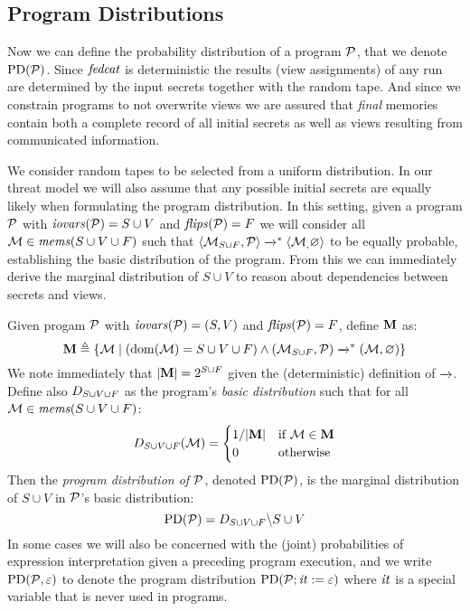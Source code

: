 \subsection{Program Distributions}
Now we can define the probability distribution of a program $\mathcal{P}$,
that we denote $\mathrm{PD}(\mathcal{P})$. Since $\mathit{fedcat}$ is deterministic the
results (view assignments) of any run are determined by the input
secrets together with the random tape. And since we constrain programs
to not overwrite views we are assured that \emph{final} memories
contain both a complete record of all initial secrets as well as views
resulting from communicated information.

We consider random tapes to be selected from a uniform distribution.
In our threat model we will also assume that any possible initial
secrets are equally likely when formulating the program distribution.
In this setting, given a program $\mathcal{P}$ with $\mathit{iovars}(\mathcal{P}) = S \cup
V$ and $\mathit{flips}(\mathcal{P}) = F$ we will consider all $\mathcal{M}
\in \mathit{mems}(S \cup V \cup F)$ such that
$
\langle \mathcal{M}_{S \cup F},\mathcal{P} \rangle \xrightarrow{}^{*} \langle \mathcal{M}_,\varnothing \rangle
$
to be equally probable, establishing the basic distribution of the
program. From this we can immediately derive the marginal distribution
of $S \cup V$ to reason about dependencies between secrets and views. 
\begin{definition}
  \label{def-progd}
  Given progam $\mathcal{P}$ with $\mathit{iovars}(\mathcal{P}) = (S,V)$ and $\mathit{flips}(\mathcal{P}) = F$, define $\mathbf{M}$ as:
  $$
  \mathbf{M} \triangleq \{ \mathcal{M} \mid (\mathrm{dom}(\mathcal{M}) = S \cup V \cup F) \wedge (\mathcal{M}_{S \cup F},\mathcal{P}) \xrightarrow{}^{*} (\mathcal{M},\varnothing) \}
  $$
  We note immediately that $|\mathbf{M}| = 2^{S \cup F}$ given the (deterministic) definition of $\xrightarrow{}$. 
  Define also $D_{S \cup V \cup F}$ as the program's \emph{basic distribution} such that for all
  $\mathcal{M} \in \mathit{mems}(S \cup V \cup F)$:
  $$
  D_{S \cup V \cup F}(\mathcal{M}) =
  \begin{cases}
    1 / |\mathbf{M}| & \text{if}\ \mathcal{M} \in \mathbf{M}\\
    0 & \text{otherwise}
  \end{cases}
  $$
  Then the \emph{program distribution of $\mathcal{P}$}, denoted $\mathrm{PD}(\mathcal{P})$, is the
  marginal distribution of $S \cup V$ in $\mathcal{P}$'s basic distribution:
  $$
  \mathrm{PD}(\mathcal{P}) =  D_{S \cup V \cup F}\backslash S\cup V
  $$
  In some cases we will also be concerned with the (joint)
  probabilities of expression interpretation given a preceding program
  execution, and we write $\mathrm{PD}(\mathcal{P}, \varepsilon)$ to denote the program
  distribution $\mathrm{PD}(\mathcal{P};\mathit{it} := \varepsilon)$ where $\mathit{it}$ is a
  special variable that is never used in programs.
\end{definition}


